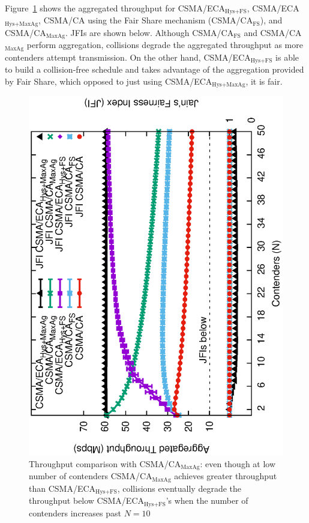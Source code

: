 	Figure~\ref{fig:ECA-vs-DCF-maxAgg} shows the aggregated throughput for CSMA/ECA$_{\text{Hys+FS}}$, CSMA/ECA$_{\text{Hys+MaxAg}}$, CSMA/CA using the Fair Share mechanism (CSMA/CA$_{\text{FS}}$), and CSMA/CA$_{\text{MaxAg}}$. JFIs are shown below. Although CSMA/CA$_{\text{FS}}$ and CSMA/CA$_{\text{MaxAg}}$ perform aggregation, collisions degrade the aggregated throughput as more contenders attempt transmission. On the other hand, CSMA/ECA$_{\text{Hys+FS}}$ is able to build a collision-free schedule and takes advantage of the aggregation provided by Fair Share, which opposed to just using CSMA/ECA$_{\text{Hys+MaxAg}}$, it is fair.
	
	
	\begin{figure}[tb]
	\centering
		\includegraphics[width=0.7\linewidth,angle=-90]{figures/throughput-max-Ag/throughput-saturated-maxAgg-TON.eps}
		\caption{Throughput comparison with CSMA/CA$_{\text{MaxAg}}$: even though at low number of contenders CSMA/CA$_{\text{MaxAg}}$ achieves greater throughput than CSMA/ECA$_{\text{Hys+FS}}$, collisions eventually degrade the throughput below CSMA/ECA$_{\text{Hys+FS}}$'s when the number of contenders increases past $N=10$}
		\label{fig:ECA-vs-DCF-maxAgg}
	\end{figure}
	
